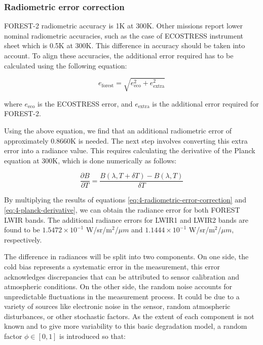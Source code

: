         \subsubsection{Radiometric error correction}

        FOREST-2 radiometric accuracy is 1K at 300K.
        Other missions report lower nominal radiometric accuracies, such as the case of ECOSTRESS instrument sheet \cite{ECOSTRESS2023INSTRUMENT} which is 0.5K at 300K.
        This difference in accuracy should be taken into account. To align these accuracies, the additional error required has to be calculated using the following equation:

        \begin{equation}
            e_{\text{forest}} = \sqrt{e_{\text{eco}}^2 + e_{\text{extra}}^2} 
            \label{eq:4-radiometric-error-correction}
        \end{equation}
        
        where $e_{\text{eco}}$ is the ECOSTRESS error, and $ e_{\text{extra}}$ is the additional error required for FOREST-2.
        
        Using the above equation, we find that an additional radiometric error of approximately 0.8660K is needed. The next step involves converting this extra error into a radiance value. This requires calculating the derivative of the Planck equation at 300K, which is done numerically as follows:
        
        \begin{equation}
            \frac{\partial B}{\partial T} = \frac{B(\lambda, T + \delta T) - B(\lambda, T)}{\delta T}
            \label{eq:4-planck-derivative}
        \end{equation}  
        
        By multiplying the results of equations \ref{eq:4-radiometric-error-correction} and \ref{eq:4-planck-derivative}, we can obtain the radiance error for both FOREST LWIR bands. The additional radiance errors for LWIR1 and LWIR2 bands are found to be \(1.5472 \times 10^{-1}\) W/sr/m\(^2\)/\(\mu m\) and \(1.1444 \times 10^{-1}\) W/sr/m\(^2\)/\(\mu m\), respectively.

        The difference in radiances will be split into two components. On one side, the cold bias represents a systematic error in the measurement, this error acknowledges discrepancies that can be attributed to sensor calibration and atmospheric conditions. On the other side, the random noise accounts for unpredictable fluctuations in the measurement process. It could be due to a variety of sources like electronic noise in the sensor, random atmospheric disturbances, or other stochastic factors. As the extent of each component is not known and to give more variability to this basic degradation model, a random factor $\phi \in [0,1] $ is introduced so that:

